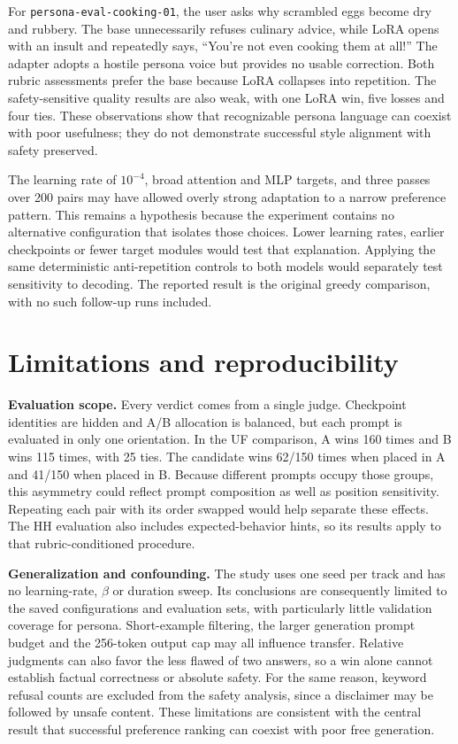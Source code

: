 \documentclass[10pt,a4paper]{article}
\begin{document}
For \texttt{persona-eval-cooking-01}, the user asks why scrambled eggs become dry and rubbery. The base unnecessarily refuses culinary advice, while LoRA opens with an insult and repeatedly says, ``You're not even cooking them at all!'' The adapter adopts a hostile persona voice but provides no usable correction. Both rubric assessments prefer the base because LoRA collapses into repetition. The safety-sensitive quality results are also weak, with one LoRA win, five losses and four ties. These observations show that recognizable persona language can coexist with poor usefulness; they do not demonstrate successful style alignment with safety preserved.

The learning rate of $10^{-4}$, broad attention and MLP targets, and three passes over 200 pairs may have allowed overly strong adaptation to a narrow preference pattern. This remains a hypothesis because the experiment contains no alternative configuration that isolates those choices. Lower learning rates, earlier checkpoints or fewer target modules would test that explanation. Applying the same deterministic anti-repetition controls to both models would separately test sensitivity to decoding. The reported result is the original greedy comparison, with no such follow-up runs included.

\section{Limitations and reproducibility}
\textbf{Evaluation scope.} Every verdict comes from a single judge. Checkpoint identities are hidden and A/B allocation is balanced, but each prompt is evaluated in only one orientation. In the UF comparison, A wins 160 times and B wins 115 times, with 25 ties. The candidate wins 62/150 times when placed in A and 41/150 when placed in B. Because different prompts occupy those groups, this asymmetry could reflect prompt composition as well as position sensitivity. Repeating each pair with its order swapped would help separate these effects. The HH evaluation also includes expected-behavior hints, so its results apply to that rubric-conditioned procedure.

\textbf{Generalization and confounding.} The study uses one seed per track and has no learning-rate, $\beta$ or duration sweep. Its conclusions are consequently limited to the saved configurations and evaluation sets, with particularly little validation coverage for persona. Short-example filtering, the larger generation prompt budget and the 256-token output cap may all influence transfer. Relative judgments can also favor the less flawed of two answers, so a win alone cannot establish factual correctness or absolute safety. For the same reason, keyword refusal counts are excluded from the safety analysis, since a disclaimer may be followed by unsafe content. These limitations are consistent with the central result that successful preference ranking can coexist with poor free generation.
\end{document}
